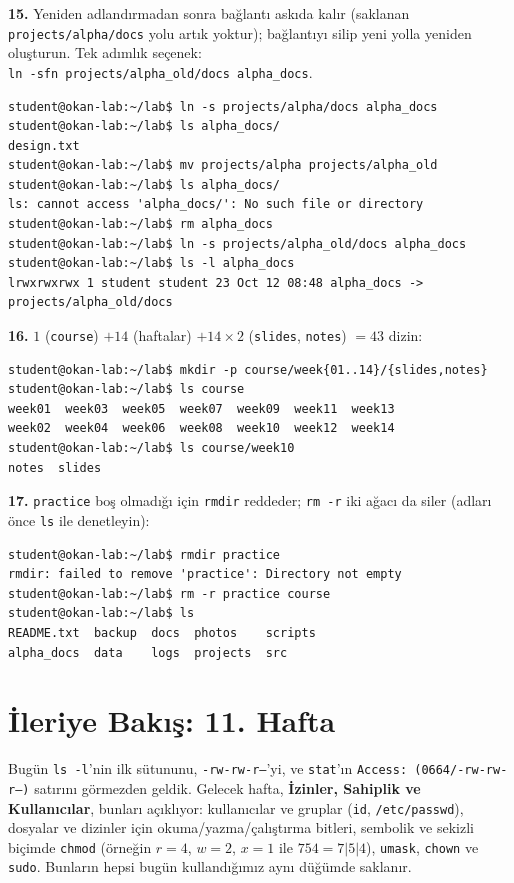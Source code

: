 \documentclass[11pt,a4paper]{article}
\newcommand{\cmd}[1]{\texttt{#1}}
\begin{document}
\textbf{15.} Yeniden adlandırmadan sonra bağlantı askıda kalır (saklanan \texttt{projects/alpha/docs} yolu artık yoktur); bağlantıyı silip yeni yolla yeniden oluşturun. Tek adımlık seçenek:\\ \cmd{ln -sfn projects/alpha\_old/docs alpha\_docs}.
\begin{lstlisting}[style=term,basicstyle=\ttfamily\scriptsize\color{light}]
student@okan-lab:~/lab$ ln -s projects/alpha/docs alpha_docs
student@okan-lab:~/lab$ ls alpha_docs/
design.txt
student@okan-lab:~/lab$ mv projects/alpha projects/alpha_old
student@okan-lab:~/lab$ ls alpha_docs/
ls: cannot access 'alpha_docs/': No such file or directory
student@okan-lab:~/lab$ rm alpha_docs
student@okan-lab:~/lab$ ln -s projects/alpha_old/docs alpha_docs
student@okan-lab:~/lab$ ls -l alpha_docs
lrwxrwxrwx 1 student student 23 Oct 12 08:48 alpha_docs -> projects/alpha_old/docs
\end{lstlisting}

\textbf{16.} $1$ (\texttt{course}) $+ 14$ (haftalar) $+ 14 \times 2$ (\texttt{slides}, \texttt{notes}) $= 43$ dizin:
\begin{lstlisting}[style=term,basicstyle=\ttfamily\scriptsize\color{light}]
student@okan-lab:~/lab$ mkdir -p course/week{01..14}/{slides,notes}
student@okan-lab:~/lab$ ls course
week01  week03  week05  week07  week09  week11  week13
week02  week04  week06  week08  week10  week12  week14
student@okan-lab:~/lab$ ls course/week10
notes  slides
\end{lstlisting}

\textbf{17.} \texttt{practice} boş olmadığı için \cmd{rmdir} reddeder; \cmd{rm -r} iki ağacı da siler (adları önce \cmd{ls} ile denetleyin):
\begin{lstlisting}[style=term,basicstyle=\ttfamily\scriptsize\color{light}]
student@okan-lab:~/lab$ rmdir practice
rmdir: failed to remove 'practice': Directory not empty
student@okan-lab:~/lab$ rm -r practice course
student@okan-lab:~/lab$ ls
README.txt  backup  docs  photos    scripts
alpha_docs  data    logs  projects  src
\end{lstlisting}

\section{İleriye Bakış: 11. Hafta}

Bugün \cmd{ls -l}'nin ilk sütununu, \texttt{-rw-rw-r--}'yi, ve \cmd{stat}'ın \texttt{Access: (0664/-rw-rw-r--)} satırını görmezden geldik. Gelecek hafta, \textbf{İzinler, Sahiplik ve Kullanıcılar}, bunları açıklıyor: kullanıcılar ve gruplar (\cmd{id}, \texttt{/etc/passwd}), dosyalar ve dizinler için okuma/yazma/çalıştırma bitleri, sembolik ve sekizli biçimde \cmd{chmod} (örneğin $r = 4$, $w = 2$, $x = 1$ ile $754 = 7|5|4$), \cmd{umask}, \cmd{chown} ve \cmd{sudo}. Bunların hepsi bugün kullandığımız aynı düğümde saklanır.
\end{document}
